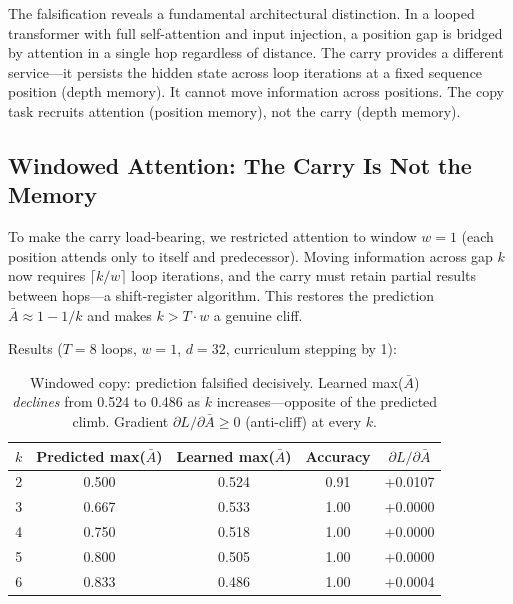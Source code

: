 \documentclass[11pt]{article}
\begin{document}
The falsification reveals a fundamental architectural distinction. In a looped transformer with full self-attention and input injection, a position gap is bridged by attention in a single hop regardless of distance. The carry provides a different service---it persists the hidden state across loop iterations at a fixed sequence position (depth memory). It cannot move information across positions. The copy task recruits attention (position memory), not the carry (depth memory).

\subsection{Windowed Attention: The Carry Is Not the Memory}
\label{subsec:windowed}

To make the carry load-bearing, we restricted attention to window $w=1$ (each position attends only to itself and predecessor). Moving information across gap $k$ now requires $\lceil k/w \rceil$ loop iterations, and the carry must retain partial results between hops---a shift-register algorithm. This restores the prediction $\bar{A} \approx 1 - 1/k$ and makes $k > T \cdot w$ a genuine cliff.

Results ($T=8$ loops, $w=1$, $d=32$, curriculum stepping by 1):

\begin{table}[ht]
\centering
\begin{tabular}{@{}ccccc@{}}
\toprule
$k$ & Predicted max($\bar{A}$) & Learned max($\bar{A}$) & Accuracy & $\partial L / \partial \bar{A}$ \\
\midrule
2 & 0.500 & 0.524 & 0.91 & +0.0107 \\
3 & 0.667 & 0.533 & 1.00 & +0.0000 \\
4 & 0.750 & 0.518 & 1.00 & +0.0000 \\
5 & 0.800 & 0.505 & 1.00 & +0.0000 \\
6 & 0.833 & 0.486 & 1.00 & +0.0004 \\
\bottomrule
\end{tabular}
\caption{Windowed copy: prediction falsified decisively. Learned max($\bar{A}$) \emph{declines} from 0.524 to 0.486 as $k$ increases---opposite of the predicted climb. Gradient $\partial L / \partial \bar{A} \geq 0$ (anti-cliff) at every $k$.}
\label{tab:windowed-copy}
\end{table}
\end{document}
